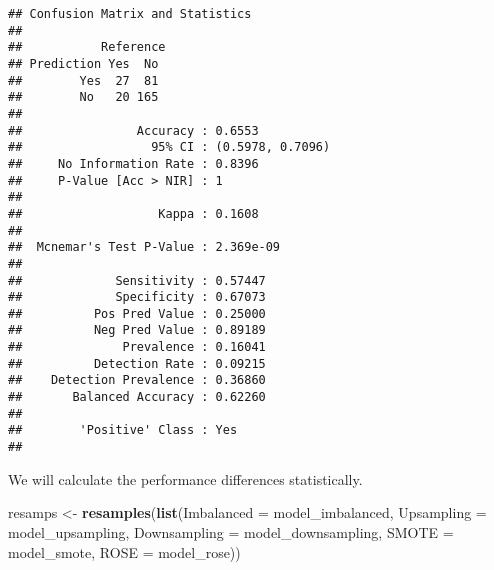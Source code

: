\documentclass[
]{article}
\newenvironment{Shaded}{\begin{snugshade}}{\end{snugshade}}
\newcommand{\DataTypeTok}[1]{\textcolor[rgb]{0.13,0.29,0.53}{#1}}
\newcommand{\KeywordTok}[1]{\textcolor[rgb]{0.13,0.29,0.53}{\textbf{#1}}}
\newcommand{\NormalTok}[1]{#1}
\newcommand{\OperatorTok}[1]{\textcolor[rgb]{0.81,0.36,0.00}{\textbf{#1}}}
\newcommand{\StringTok}[1]{\textcolor[rgb]{0.31,0.60,0.02}{#1}}
\begin{document}
\begin{Shaded}
\end{Shaded}

\begin{verbatim}
## Confusion Matrix and Statistics
## 
##           Reference
## Prediction Yes  No
##        Yes  27  81
##        No   20 165
##                                           
##                Accuracy : 0.6553          
##                  95% CI : (0.5978, 0.7096)
##     No Information Rate : 0.8396          
##     P-Value [Acc > NIR] : 1               
##                                           
##                   Kappa : 0.1608          
##                                           
##  Mcnemar's Test P-Value : 2.369e-09       
##                                           
##             Sensitivity : 0.57447         
##             Specificity : 0.67073         
##          Pos Pred Value : 0.25000         
##          Neg Pred Value : 0.89189         
##              Prevalence : 0.16041         
##          Detection Rate : 0.09215         
##    Detection Prevalence : 0.36860         
##       Balanced Accuracy : 0.62260         
##                                           
##        'Positive' Class : Yes             
## 
\end{verbatim}

We will calculate the performance differences statistically.

\begin{Shaded}
\begin{Highlighting}[]
\NormalTok{resamps <-}\StringTok{ }\KeywordTok{resamples}\NormalTok{(}\KeywordTok{list}\NormalTok{(}\DataTypeTok{Imbalanced =}\NormalTok{ model_imbalanced,}
                          \DataTypeTok{Upsampling =}\NormalTok{ model_upsampling,}
                          \DataTypeTok{Downsampling =}\NormalTok{ model_downsampling,}
                          \DataTypeTok{SMOTE =}\NormalTok{ model_smote,}
                          \DataTypeTok{ROSE =}\NormalTok{ model_rose))}
\end{Highlighting}
\end{Shaded}

\begin{Shaded}
\end{Shaded}
\end{document}
